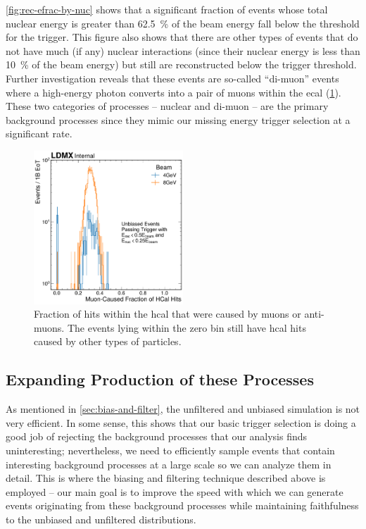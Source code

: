 \cref{fig:rec-efrac-by-nuc} shows that a significant fraction of events whose total nuclear
energy is greater than \qty{62.5}{\percent} of the beam energy fall below the threshold for
the trigger.
This figure also shows that there are other types of events that do not have much (if any)
nuclear interactions (since their nuclear energy is less than \qty{10}{\percent} of the beam
energy) but still are reconstructed below the trigger threshold.
Further investigation reveals that these events are so-called ``di-muon'' events where
a high-energy photon converts into a pair of muons within the \ac{ecal} (\cref{fig:dimuon-confirm}).
These two categories of processes -- nuclear and di-muon -- are the primary background
processes since they mimic our missing energy trigger selection at a significant rate.

\begin{figure}
  \centering
  \includegraphics[width=0.5\textwidth]{figures/ldmx/simulation/dimuon-confirmation-hcal-hit-fraction.pdf}
  \caption{Fraction of hits within the \ac{hcal} that were caused by muons or anti-muons.
  The events lying within the zero bin still have \ac{hcal} hits caused by other types of particles.}
  \label{fig:dimuon-confirm}
\end{figure}

\subsection{Expanding Production of these Processes}
As mentioned in \cref{sec:bias-and-filter}, the unfiltered and unbiased simulation is
not very efficient.
In some sense, this shows that our basic trigger selection is doing a good job of
rejecting the background processes that our analysis finds uninteresting;
nevertheless, we need to efficiently sample events that contain interesting background processes
at a large scale so we can analyze them in detail.
This is where the biasing and filtering technique described above is employed --
our main goal is to improve the speed with which we can generate events originating from
these background processes while maintaining faithfulness to the unbiased and unfiltered distributions.

